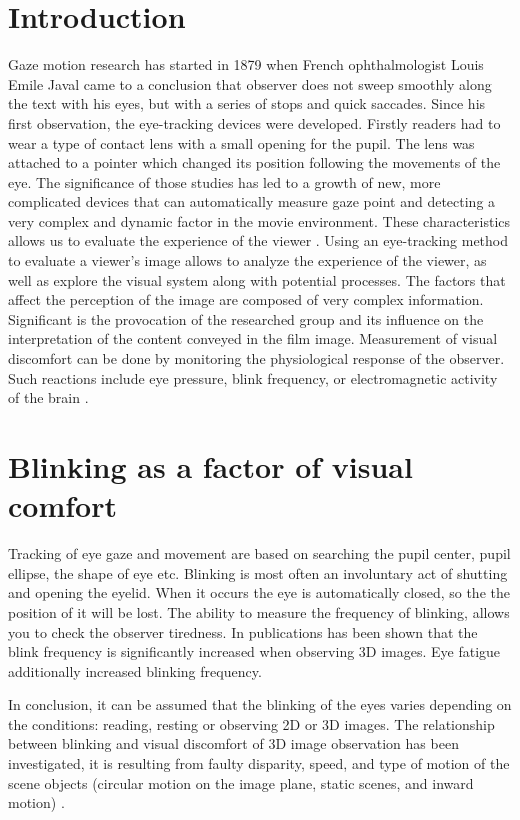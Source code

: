 \documentclass[runningheads,a4paper]{llncs}
\begin{document}
\section{Introduction}\label{sec:intro}
Gaze motion research has started in 1879 when French ophthalmologist Louis Emile Javal came to a conclusion that observer does not sweep smoothly along the text with his eyes, but with a series of stops and quick saccades\cite{Winery}.  Since his first observation, the eye-tracking devices were developed. Firstly readers had to wear a type of contact lens with a small opening for the pupil. The lens was attached to a pointer which changed its position following the movements of the eye. The significance of those studies has led to a growth of new, more complicated devices that can automatically measure gaze point and detecting a very complex and dynamic factor in the movie environment. These characteristics allows us to evaluate the experience of the viewer \cite{mital2011clustering}.
Using an eye-tracking method to evaluate a viewer's image allows to analyze the experience of the viewer, as well as explore the visual system along with potential processes.
The factors that affect the perception of the image are composed of very complex information. Significant is the provocation of the researched group and its influence on the interpretation of the content conveyed in the film image. Measurement of visual discomfort can be done by monitoring the physiological response of the observer. Such reactions include eye pressure, blink frequency, or electromagnetic activity of the brain \cite{Fornalczyk_Napieralski_Szajerman_Wojciechowski_2015, Fornalczyk_Napieralski_Szajerman_Wojciechowski_20152}.



\section{Blinking as a factor of visual comfort}
Tracking of eye gaze and movement are based on searching the pupil center, pupil ellipse, the shape of eye etc. Blinking is most often an involuntary act of shutting and opening the eyelid. When it occurs the eye is automatically closed, so the the position of it will be lost. The ability to measure the frequency of blinking, allows you to check the observer tiredness. In publications \cite{5606312, 6211573} has been shown that the blink frequency is significantly increased when observing 3D images. Eye fatigue additionally increased blinking frequency. 
\par In conclusion, it can be assumed that the blinking of the eyes varies depending on the conditions: reading, resting or observing 2D or 3D images. The relationship between blinking and visual discomfort of 3D image observation has been investigated, it is resulting from faulty disparity, speed, and type of motion of the scene objects (circular motion on the image plane, static scenes, and inward motion) \cite{00789026}. 
\end{document}

